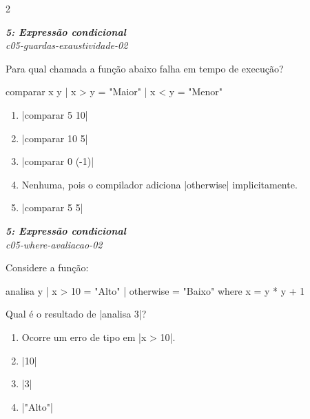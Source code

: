 \documentclass[a4paper,10pt,brazil]{article}
\begin{document}
\begin{multicols}{2}
\begin{flushright}
  \footnotesize
  \textit{\textbf{5: Expressão condicional}}\\
  \textit{c05-guardas-exaustividade-02}\\

\end{flushright}
Para qual chamada a função abaixo falha em tempo de execução?
\begin{haskellcode}
comparar x y
  | x > y = "Maior"
  | x < y = "Menor"
\end{haskellcode}

\begin{enumerate}
  \item \haskellinline|comparar 5 10|

  \item \haskellinline|comparar 10 5|

  \item \haskellinline|comparar 0 (-1)|

  \item Nenhuma, pois o compilador adiciona \haskellinline|otherwise| implicitamente.

  \item \haskellinline|comparar 5 5|


\end{enumerate}

\begin{flushright}
  \footnotesize
  \textit{\textbf{5: Expressão condicional}}\\
  \textit{c05-where-avaliacao-02}\\

\end{flushright}
Considere a função:
\begin{haskellcode}
analisa y
  | x > 10    = "Alto"
  | otherwise = "Baixo"
  where
    x = y * y + 1
\end{haskellcode}
Qual é o resultado de \haskellinline|analisa 3|?

\begin{enumerate}
  \item Ocorre um erro de tipo em \haskellinline|x > 10|.

  \item \haskellinline|10|

  \item \haskellinline|3|

  \item \haskellinline|"Alto"|


\end{enumerate}
\end{multicols}
\end{document}
